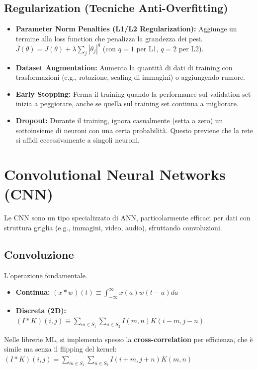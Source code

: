 \documentclass[a4paper,11pt]{article}
\begin{document}
\subsection{Regularization (Tecniche Anti-Overfitting)}
\begin{itemize}
    \item \textbf{Parameter Norm Penalties (L1/L2 Regularization):} Aggiunge un termine alla loss function che penalizza la grandezza dei pesi.
    $\bar{J}(\theta) = J(\theta) + \lambda \sum_j |\theta_j|^q$ (con $q=1$ per L1, $q=2$ per L2).
    \item \textbf{Dataset Augmentation:} Aumenta la quantità di dati di training con trasformazioni (e.g., rotazione, scaling di immagini) o aggiungendo rumore.
    \item \textbf{Early Stopping:} Ferma il training quando la performance sul validation set inizia a peggiorare, anche se quella sul training set continua a migliorare.
    \item \textbf{Dropout:} Durante il training, ignora casualmente (setta a zero) un sottoinsieme di neuroni con una certa probabilità. Questo previene che la rete si affidi eccessivamente a singoli neuroni.
\end{itemize}

\section{Convolutional Neural Networks (CNN)}

Le CNN sono un tipo specializzato di ANN, particolarmente efficaci per dati con struttura griglia (e.g., immagini, video, audio), sfruttando convoluzioni.

\subsection{Convoluzione}
L'operazione fondamentale.
\begin{itemize}
    \item \textbf{Continua:} $(x * w)(t) \equiv \int_{-\infty}^{\infty} x(a) w(t - a) da$
    \item \textbf{Discreta (2D):} $(I * K)(i, j) \equiv \sum_{m \in S_1} \sum_{n \in S_2} I(m, n)K(i - m, j - n)$
\end{itemize}
Nelle librerie ML, si implementa spesso la \textbf{cross-correlation} per efficienza, che è simile ma senza il flipping del kernel:
$(I * K)(i, j) = \sum_{m \in S_1} \sum_{n \in S_2} I(i + m, j + n)K(m, n)$
\end{document}
